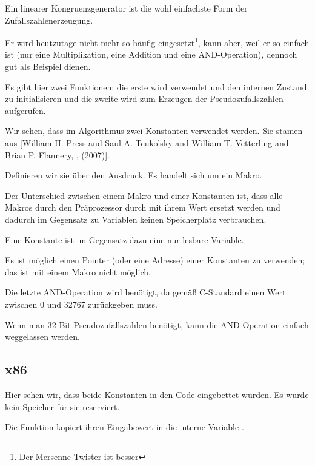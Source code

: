 \label{LCG_simple}
Ein linearer Kongruenzgenerator ist die wohl einfachste Form der Zufallszahlenerzeugung.

Er wird heutzutage nicht mehr so häufig eingesetzt\footnote{Der Mersenne-Twister ist besser}, kann aber, weil er so
einfach ist (nur eine Multiplikation, eine Addition und eine AND-Operation), dennoch gut als Beispiel dienen.


Es gibt hier zwei Funktionen: die erste wird verwendet und den internen Zustand zu initialisieren und die zweite wird
zum Erzeugen der Pseudozufallszahlen aufgerufen.

Wir sehen, dass im Algorithmus zwei Konstanten verwendet werden.
Sie stamen aus [William H. Press and Saul A. Teukolsky and William T. Vetterling and Brian P. Flannery, , (2007)].

Definieren wir sie über den  \CCpp Ausdruck. Es handelt sich um ein Makro.

Der Unterschied zwischen einem \CCpp Makro und einer Konstanten ist, dass alle Makros durch den \CCpp Präprozessor durch
mit ihrem Wert ersetzt werden und dadurch im Gegensatz zu Variablen keinen Speicherplatz verbrauchen.

Eine Konstante ist im Gegensatz dazu eine nur lesbare Variable.

Es ist möglich einen Pointer (oder eine Adresse) einer Konstanten zu verwenden; das ist mit einem Makro nicht möglich.

Die letzte AND-Operation wird benötigt, da  gemäß C-Standard einen Wert zwischen 0 und 32767 zurückgeben
muss.

Wenn man 32-Bit-Pseudozufallszahlen benötigt, kann die AND-Operation einfach weggelassen werden.

\subsection{x86}


Hier sehen wir, dass beide Konstanten in den Code eingebettet wurden. Es wurde kein Speicher für sie reserviert.

Die Funktion  kopiert ihren Eingabewert in die interne Variable .


